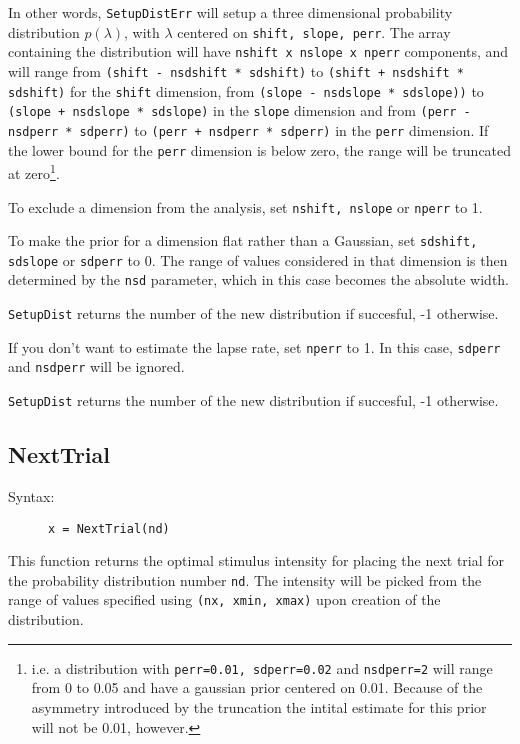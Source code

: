 \documentclass[10pt,letterpaper]{article}
\begin{document}
In other words, {\tt SetupDistErr} will setup a three dimensional probability 
distribution $p(\lambda)$, with $\lambda$ centered on {\tt shift, slope, perr}. 
The array containing the distribution will have {\tt nshift x nslope x nperr} 
components, and will range from {\tt (shift - nsdshift * sdshift)} to {\tt (shift + 
nsdshift * sdshift)} for the {\tt shift} dimension, from {\tt (slope - nsdslope * 
sdslope))} to {\tt (slope + nsdslope * sdslope)} in the {\tt slope} dimension 
and from {\tt (perr - nsdperr * sdperr)} to {\tt (perr + nsdperr * sdperr)} in 
the {\tt perr} dimension. If the lower bound for the {\tt perr} dimension is
below zero, the range will be truncated at zero\footnote{i.e. a distribution with
{\tt perr=0.01, sdperr=0.02} and {\tt nsdperr=2} will range from 0 to 0.05 and have
a gaussian prior centered on 0.01. Because of the asymmetry introduced by the truncation the
intital estimate for this prior will not be 0.01, however.}.

To exclude a dimension from the analysis, set {\tt nshift, nslope} or {\tt nperr} 
to 1. 

To make the prior for a dimension flat rather than a Gaussian, set {\tt sdshift, 
sdslope} or {\tt sdperr} to 0. The range of values considered in that dimension 
is then determined by the {\tt nsd} parameter, which in this case becomes the 
absolute width.

{\tt SetupDist} returns the number of the new distribution if succesful, -1 
otherwise.

If you don't want to estimate the lapse rate, set {\tt nperr} to 1. In this case,
{\tt sdperr} and {\tt nsdperr} will be ignored.

{\tt SetupDist} returns the number of the new distribution if succesful, -1 
otherwise.

\subsection{NextTrial}

\begin{description}
\item[Syntax:] {\tt x = NextTrial(nd)}
\end{description}

This function returns the optimal stimulus intensity for placing the next trial 
for the probability distribution number {\tt nd}. The intensity will be picked 
from the range of values specified using {\tt (nx, xmin, xmax)} upon creation of 
the distribution.
\end{document}
